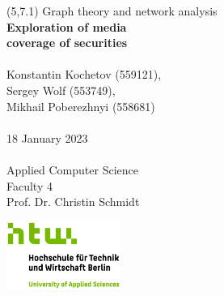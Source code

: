 \begin{titlepage}

\begingroup
\begin{textblock}{6}(5,7.1)
\setlength{\parindent}{0pt}
\fontsize{10pt}{1.1em}\selectfont
Graph theory and network analysis
\vspace{0.1cm}
\\
\LARGE
{\color{htwgreen}
\textbf{Exploration of media \\ coverage of securities}
}\\\\
\fontsize{10pt}{1.1em}\selectfont
Konstantin Kochetov (559121),\\
Sergey Wolf (553749),\\
Mikhail Poberezhnyi (558681)
\\
\\
18 January 2023\\\\
Applied Computer Science\\
Faculty 4\\
Prof. Dr. Christin Schmidt\\
\end{textblock}
\endgroup
     
\vfill
        
\begin{center}
\includegraphics[width=0.28\textwidth,keepaspectratio]{images/HTW_Logo_rgb.jpg}
\end{center}

\end{titlepage}